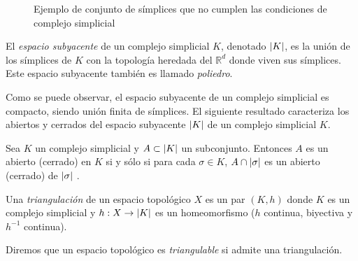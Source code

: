 \begin{figure}[ht]
\centering
{}
\caption{Ejemplo de conjunto de símplices que no cumplen las condiciones de complejo simplicial}
\label{ref:noComp}
\end{figure}

\begin{definition}
El \emph{espacio subyacente} de un complejo simplicial $K$, denotado $\lvert K\rvert$, es la unión de los símplices de $K$ con la topología heredada del $\mathbb{R}^d$ donde viven sus símplices. Este espacio subyacente también es llamado \emph{poliedro}.
\end{definition}
Como se puede observar, el espacio subyacente  de un complejo simplicial es compacto, siendo unión finita de símplices. El siguiente resultado caracteriza los abiertos y cerrados del espacio subyacente $\lvert K\rvert$ de un complejo simplicial $K$.

\begin{proposition}
Sea $K$ un complejo simplicial y $A \subset \lvert K\rvert$ un subconjunto. Entonces $A$ es un abierto (cerrado) en $K$ si y sólo si para cada $\sigma \in K$, $A \cap \lvert\sigma\rvert$ es un abierto (cerrado) de $\lvert\sigma\rvert$ \cite{libroEH}.
\end{proposition}

\begin{definition}
Una \emph{triangulación} de un espacio topológico $X$ es un par $(K, h)$ donde $K$ es un complejo simplicial y $h: X \to \lvert K\rvert$ es un homeomorfismo ($h$ continua, biyectiva y $h^{-1}$ continua).
\end{definition}
Diremos que un espacio topológico es \emph{triangulable} si admite una triangulación.

